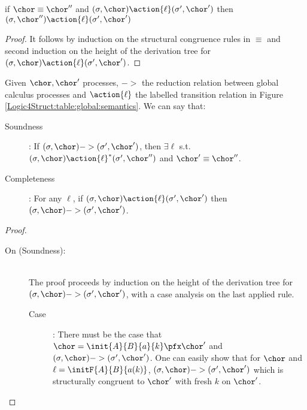 \begin{lemma} \label{struct:gc-opsem} if $\chor \equiv \chor''$ and
  $(\sigma,\chor) \action{\ell} (\sigma',\chor')$ then
  $(\sigma,\chor'') \action{\ell}(\sigma',\chor')$
  \begin{proof}
    It follows by induction on the structural congruence rules in
    $\equiv$ and second induction on the height of the derivation tree
    for $(\sigma,\chor) \action{\ell} (\sigma',\chor')$.
  \end{proof}
\end{lemma}

\begin{proposition}
  Given $\chor, \chor'$ processes, $->$ the reduction relation between
  global calculus processes 
  and
  $\action{\ell}$ the labelled transition relation in Figure
  \ref{Logic4Struct:table:global:semantics}. We can say that:

\begin{description}
  \item [Soundness]: If $(\sigma, \chor) -> (\sigma', \chor')$, then
    $\exists \ell $ s.t. $ (\sigma, \chor) \action{\ell}^*
    (\sigma', \chor'')$ and $\chor' \equiv \chor''$.
  \item [Completeness]: For any $\ell$, if $(\sigma, \chor) \action{\ell} (\sigma',
    \chor')$ then $(\sigma, \chor) -> (\sigma',  \chor')$. 
\end{description}
\begin{proof} \hfill
\begin{description}

\item[On (Soundness):] \hfill \\ 
The proof proceeds by induction on the height of the derivation tree
for $(\sigma,\chor) -> (\sigma',\chor')$,
with a case analysis on the last applied rule. 
 \begin{description}
   \item[Case ]: There must be the case that $\chor =
     \init{A}{B}{a}{k} \pfx \chor'$ and $(\sigma, \chor) ->(\sigma',
      \chor')$. One can easily show that for $\chor$ and $\ell=
     \initF{A}{B}{a(k)}$, $(\sigma, \chor)->(\sigma',\chor')$ which is
     structurally congruent to $%
     \chor'$ with fresh $k$ on
     $\chor'$.


\end{description}
\end{description}
\end{proof}
\end{proposition}
